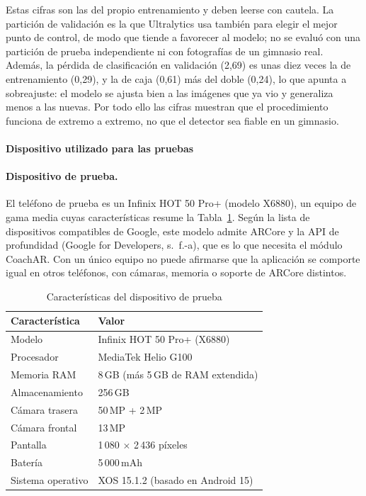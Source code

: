 Estas cifras son las del propio entrenamiento y deben leerse con cautela. La
partición de validación es la que Ultralytics usa también para elegir el mejor
punto de control, de modo que tiende a favorecer al modelo; no se evaluó con una
partición de prueba independiente ni con fotografías de un gimnasio real. Además,
la pérdida de clasificación en validación (2,69) es unas diez veces la de
entrenamiento (0,29), y la de caja (0,61) más del doble (0,24), lo que apunta a
sobreajuste: el modelo se ajusta bien a las imágenes que ya vio y generaliza
menos a las nuevas. Por todo ello las cifras muestran que el procedimiento
funciona de extremo a extremo, no que el detector sea fiable en un gimnasio.

\paragraph{Dispositivo utilizado para las pruebas}

\paragraph{Dispositivo de prueba.} El teléfono de prueba es un Infinix HOT 50
Pro+ (modelo X6880), un equipo de gama media cuyas características resume la
Tabla~\ref{tab:dispositivo-prueba}. Según la lista de dispositivos compatibles
de Google, este modelo admite ARCore y la API de profundidad (Google for
Developers, s.~f.-a), que es lo que necesita el módulo CoachAR. Con un único
equipo no puede afirmarse que la aplicación se comporte igual en otros
teléfonos, con cámaras, memoria o soporte de ARCore distintos.

\begin{table}[H]
\centering
\caption{Características del dispositivo de prueba}
\label{tab:dispositivo-prueba}
\small
\begin{tabular}{|l|l|}
\hline
\rowcolor{encabezado} \textbf{Característica} & \textbf{Valor} \\
\hline
Modelo & Infinix HOT 50 Pro+ (X6880) \\ \hline
Procesador & MediaTek Helio G100 \\ \hline
Memoria RAM & 8\,GB (más 5\,GB de RAM extendida) \\ \hline
Almacenamiento & 256\,GB \\ \hline
Cámara trasera & 50\,MP + 2\,MP \\ \hline
Cámara frontal & 13\,MP \\ \hline
Pantalla & 1\,080 $\times$ 2\,436 píxeles \\ \hline
Batería & 5\,000\,mAh \\ \hline
Sistema operativo & XOS 15.1.2 (basado en Android 15) \\
\hline
\end{tabular}
\end{table}





